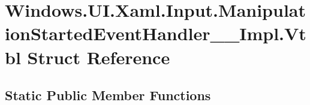\hypertarget{struct_windows_1_1_u_i_1_1_xaml_1_1_input_1_1_manipulation_started_event_handler_____impl_1_1_vtbl}{}\section{Windows.\+U\+I.\+Xaml.\+Input.\+Manipulation\+Started\+Event\+Handler\+\_\+\+\_\+\+Impl.\+Vtbl Struct Reference}
\label{struct_windows_1_1_u_i_1_1_xaml_1_1_input_1_1_manipulation_started_event_handler_____impl_1_1_vtbl}
\subsection*{Static Public Member Functions}

